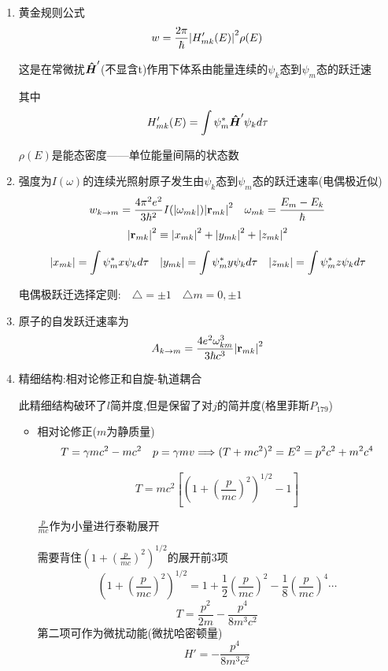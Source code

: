 \begin{formal}
\begin{enumerate}
                \item 黄金规则公式
                $$ w = \frac{2\pi}{\hbar}  \abs{H_{mk}'(E)}^{2} \rho(E) $$

                这是在常微扰$\vu*{H}'$(不显含t)作用下体系由能量连续的$\psi_{k}$态到$\psi_{m}$态的跃迁速

                其中
                $$ H_{mk}'(E) = \int \psi_{m}^{*} \vu*{H}' \psi_{k} d\tau $$

                $\rho(E)$是能态密度——单位能量间隔的状态数

                \item 强度为$I(\omega)$的连续光照射原子发生由$\psi_{k}$态到$\psi_{m}$态的跃迁速率(电偶极近似)
                $$ w_{k \rightarrow m} = \frac{4\pi^{2}e^{2}}{3\hbar^{2}} I(\abs{\omega_{mk}}) \abs{\vb{r}_{mk}}^{2} \quad \omega_{mk} = \dfrac{E_{m}-E_{k}}{\hbar} $$
                $$ \abs{\vb{r}_{mk}}^{2} \equiv \abs{x_{mk}}^{2} + \abs{y_{mk}}^{2} + \abs{z_{mk}}^{2} $$
                $$ \abs{x_{mk}} = \int \psi_{m}^{*}x\psi_{k} d\tau  \quad \abs{y_{mk}} = \int \psi_{m}^{*}y\psi_{k} d\tau \quad \abs{z_{mk}} = \int \psi_{m}^{*}z\psi_{k} d\tau $$
                
                电偶极跃迁选择定则:$ \quad \triangle = \pm 1 \quad \triangle m = 0,\pm 1 $

                \item 原子的自发跃迁速率为
                $$ A_{k \rightarrow m} = \frac{4e^{2}\omega_{km}^{3}}{3\hbar c^{3}} \abs{\vb{r}_{mk}}^{2} $$

                \item 精细结构:相对论修正和自旋-轨道耦合

                    此精细结构破环了$l$简并度,但是保留了对$j$的简并度(格里菲斯$P_{179}$)
                    \begin{itemize}
                        \item 相对论修正($m$为静质量)
                        $$ T = \gamma m c^{2} - m c^{2} \quad p = \gamma m v \Longrightarrow (T + mc^{2})^{2} = E^{2} = p^{2}c^{2} + m^{2}c^{4} $$
                        
                        $$ T = m c^{2} [ (1+(\frac{p}{m c})^{2})^{1/2} - 1] $$

                        $\frac{p}{mc}$作为小量进行泰勒展开

                        需要背住$(1+(\frac{p}{m c})^{2})^{1/2}$的展开前3项
                        $$ (1+(\frac{p}{m c})^{2})^{1/2} = 1 + \frac{1}{2} (\frac{p}{mc})^{2} - \frac{1}{8} (\frac{p}{mc})^{4} \cdots  $$
                        $$ T = \frac{p^{2}}{2m} - \frac{p^{4}}{8m^{3}c^{2}} $$
                        第二项可作为微扰动能(微扰哈密顿量)
                        $$ H' =  - \frac{p^{4}}{8m^{3}c^{2}} $$


\end{itemize}
\end{enumerate}
\end{formal}
